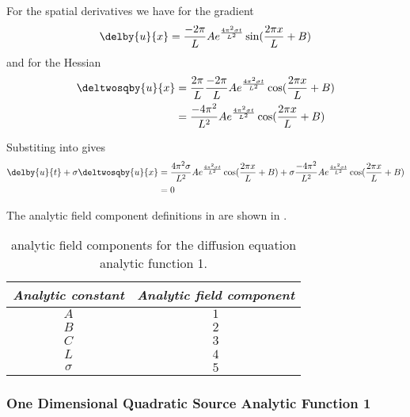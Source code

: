 For the spatial derivatives we have for the gradient
\begin{equation}
  \delby{u}{x}=\dfrac{-2\pi}{L}Ae^{\frac{4\pi^{2}\sigma t}{L^{2}}}\sin(\frac{2\pi x}{L} + B)
  \label{eqn:AnalyticDiffusionEquationOneDim1Gradient}
\end{equation}
and for the Hessian
\begin{align}
  \deltwosqby{u}{x} &=\dfrac{2\pi}{L}\dfrac{-2\pi}{L}Ae^{\frac{4\pi^{2}\sigma t}{L^{2}}}\cos(\frac{2\pi x}{L} + B) \\
  & = \dfrac{-4\pi^{2}}{L^{2}}Ae^{\frac{4\pi^{2}\sigma t}{L^{2}}}\cos(\frac{2\pi x}{L} + B)
  \label{eqn:AnalyticDiffusionEquationOneDim1Hessian}
\end{align}

Substiting
into  gives
\begin{equation}
  \begin{aligned}
    \delby{u}{t}+\sigma\deltwosqby{u}{x} &=
    \dfrac{4\pi^{2}\sigma}{L^{2}}Ae^{\frac{4\pi^{2}\sigma t}{L^{2}}}\cos(\frac{2\pi x}{L} + B) +
    \sigma\dfrac{-4\pi^{2}}{L^{2}}Ae^{\frac{4\pi^{2}\sigma t}{L^{2}}}\cos(\frac{2\pi x}{L} + B) \\
    &= 0
  \end{aligned}
\end{equation}

The analytic field component definitions in \OpenCMISS are shown in .

\begin{table}[htb] \centering
  \begin{tabular}{|c|c|} \hline
    \emph{Analytic constant} & \emph{Analytic field component} \\ \hline \hline
    $A$ & $1$ \\ 
    $B$ & $2$ \\
    $C$ & $3$ \\
    $L$ & $4$ \\ 
    $\sigma$ & $5$ \\ \hline
  \end{tabular}
  \caption{\OpenCMISS analytic field components for the \oned diffusion equation
    analytic function 1.}
  \label{tab:OpenCMISSAnalyticFieldDiffusionEquationOneDim1}
\end{table}

\subsubsection{One Dimensional Quadratic Source Analytic Function 1}

